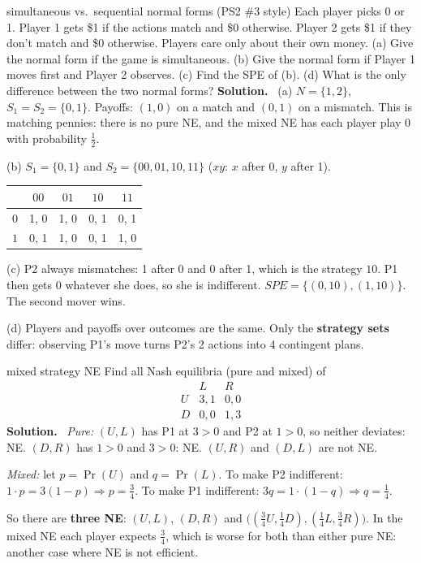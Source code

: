 \documentclass[11pt]{article}
\newcommand{\soln}{\tcblower\textbf{Solution.}\ }
\begin{document}
\begin{examq}{simultaneous vs.\ sequential normal forms (PS2 \#3 style)}
Each player picks 0 or 1. Player 1 gets \$1 if the actions match and \$0 otherwise. Player 2 gets \$1 if they don't match and \$0 otherwise. Players care only about their own money.
(a) Give the normal form if the game is simultaneous. (b) Give the normal form if Player 1 moves first and Player 2 observes. (c) Find the SPE of (b). (d) What is the only difference between the two normal forms?
\soln
(a) $N=\{1,2\}$, $S_1=S_2=\{0,1\}$. Payoffs: $(1,0)$ on a match and $(0,1)$ on a mismatch. This is matching pennies: there is no pure NE, and the mixed NE has each player play 0 with probability $\tfrac12$.

(b) $S_1=\{0,1\}$ and $S_2=\{00,01,10,11\}$ ($xy$: $x$ after 0, $y$ after 1).
\begin{center}
\begin{tabular}{c|cccc}
 & $00$ & $01$ & $10$ & $11$\\\hline
$0$ & 1, 0 & 1, 0 & 0, 1 & 0, 1\\
$1$ & 0, 1 & 1, 0 & 0, 1 & 1, 0
\end{tabular}
\end{center}
(c) P2 always mismatches: 1 after 0 and 0 after 1, which is the strategy $10$. P1 then gets 0 whatever she does, so she is indifferent. $SPE=\{(0,10),(1,10)\}$. The second mover wins.

(d) Players and payoffs over outcomes are the same. Only the \textbf{strategy sets} differ: observing P1's move turns P2's 2 actions into 4 contingent plans.
\end{examq}

\begin{examq}{mixed strategy NE}
Find all Nash equilibria (pure and mixed) of
\[
\begin{array}{c|cc}
 & L & R\\\hline
U & 3,1 & 0,0\\
D & 0,0 & 1,3
\end{array}
\]
\soln
\emph{Pure:} $(U,L)$ has P1 at $3>0$ and P2 at $1>0$, so neither deviates: NE. $(D,R)$ has $1>0$ and $3>0$: NE. $(U,R)$ and $(D,L)$ are not NE.

\emph{Mixed:} let $p=\Pr(U)$ and $q=\Pr(L)$. To make P2 indifferent: $1\cdot p=3(1-p)\Rightarrow p=\tfrac34$. To make P1 indifferent: $3q=1\cdot(1-q)\Rightarrow q=\tfrac14$.

So there are \textbf{three NE}: $(U,L)$, $(D,R)$ and $\big((\tfrac34U,\tfrac14D),(\tfrac14L,\tfrac34R)\big)$. In the mixed NE each player expects $\tfrac34$, which is worse for both than either pure NE: another case where NE is not efficient.
\end{examq}
\end{document}
